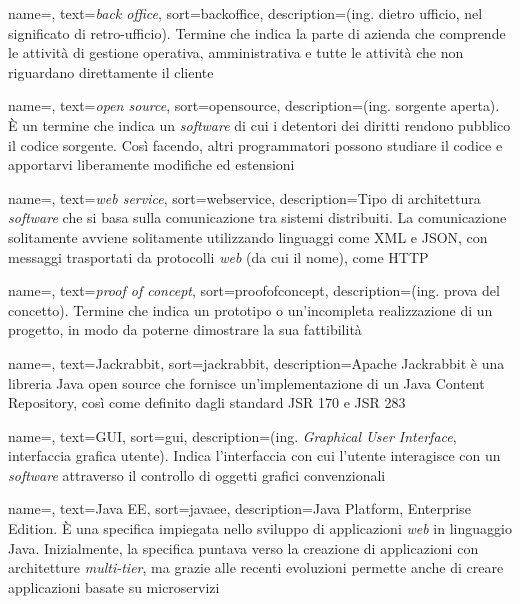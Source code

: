  {
	name=,
	text=\textit{back office},
	sort=backoffice,
	description={(ing. dietro ufficio, nel significato di retro-ufficio). Termine che indica la parte di azienda che comprende le attività di gestione operativa, amministrativa e tutte le attività che non riguardano direttamente il cliente}
}

 {
	name=,
	text=\textit{open source},
	sort=opensource,
	description={(ing. sorgente aperta). È un termine che indica un \textit{software} di cui i detentori dei diritti rendono pubblico il codice sorgente. Così facendo, altri programmatori possono studiare il codice e apportarvi liberamente modifiche ed estensioni}
}

 {
	name=,
	text=\textit{web service},
	sort=webservice,
	description={Tipo di architettura \textit{software} che si basa sulla comunicazione tra sistemi distribuiti. La comunicazione solitamente avviene solitamente utilizzando linguaggi come XML e JSON, con messaggi trasportati da protocolli \textit{web} (da cui il nome), come HTTP}
}

 {
	name=,
	text=\textit{proof of concept},
	sort=proofofconcept,
	description={(ing. prova del concetto). Termine che indica un prototipo o un'incompleta realizzazione di un progetto, in modo da poterne dimostrare la sua fattibilità}
}

 {
	name=,
	text=Jackrabbit,
	sort=jackrabbit,
	description={Apache Jackrabbit è una libreria Java open source che fornisce un'implementazione di un Java Content Repository, così come definito dagli standard JSR 170 e JSR 283}
}

 {
	name=,
	text=GUI,
	sort=gui,
	description={(ing. \textit{Graphical User Interface}, interfaccia grafica utente). Indica l'interfaccia con cui l'utente interagisce con un \textit{software} attraverso il controllo di oggetti grafici convenzionali}
}

 {
	name=,
	text=Java EE,
	sort=javaee,
	description={Java Platform, Enterprise Edition. È una specifica impiegata nello sviluppo di applicazioni \textit{web} in linguaggio Java. Inizialmente, la specifica puntava verso la creazione di applicazioni con architetture \textit{multi-tier}, ma grazie alle recenti evoluzioni permette anche di creare applicazioni basate su microservizi}
}

